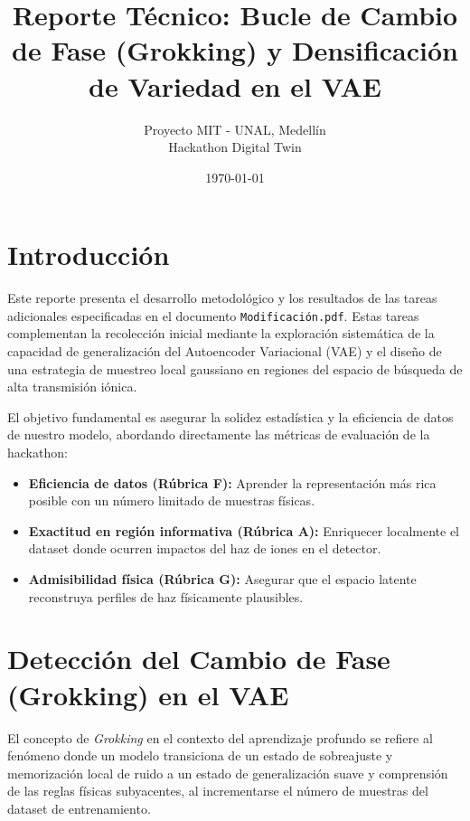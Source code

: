 \documentclass[12pt,letterpaper]{article}
\title{\textbf{Reporte Técnico: Bucle de Cambio de Fase (Grokking) y Densificación de Variedad en el VAE}}
\author{Proyecto MIT - UNAL, Medellín \\ Hackathon Digital Twin}
\date{\today}
\begin{document}
\maketitle

\section{Introducción}
Este reporte presenta el desarrollo metodológico y los resultados de las tareas adicionales especificadas en el documento \texttt{Modificación.pdf}. Estas tareas complementan la recolección inicial mediante la exploración sistemática de la capacidad de generalización del Autoencoder Variacional (VAE) y el diseño de una estrategia de muestreo local gaussiano en regiones del espacio de búsqueda de alta transmisión iónica.

El objetivo fundamental es asegurar la solidez estadística y la eficiencia de datos de nuestro modelo, abordando directamente las métricas de evaluación de la hackathon:
\begin{itemize}
    \item \textbf{Eficiencia de datos (Rúbrica F):} Aprender la representación más rica posible con un número limitado de muestras físicas.
    \item \textbf{Exactitud en región informativa (Rúbrica A):} Enriquecer localmente el dataset donde ocurren impactos del haz de iones en el detector.
    \item \textbf{Admisibilidad física (Rúbrica G):} Asegurar que el espacio latente reconstruya perfiles de haz físicamente plausibles.
\end{itemize}

\section{Detección del Cambio de Fase (Grokking) en el VAE}
El concepto de \textit{Grokking} en el contexto del aprendizaje profundo se refiere al fenómeno donde un modelo transiciona de un estado de sobreajuste y memorización local de ruido a un estado de generalización suave y comprensión de las reglas físicas subyacentes, al incrementarse el número de muestras del dataset de entrenamiento.
\end{document}
